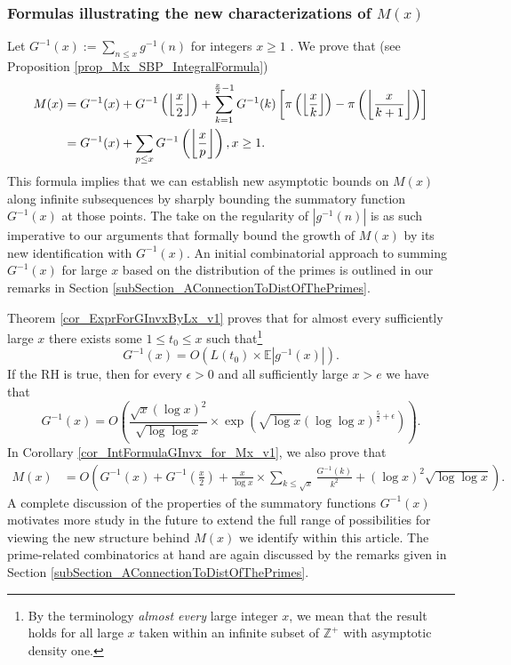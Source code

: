 \documentclass[11pt,reqno,a4letter]{article}
\numberwithin{figure}{section}
\numberwithin{table}{section}
\newcommand{\seqnum}[1]{\href{http://oeis.org/#1}{\color{ProcessBlue}{\underline{#1}}}}
\newcommand{\Floor}[2]{\ensuremath{\left\lfloor \frac{#1}{#2} \right\rfloor}}
\theoremstyle{plain}
\numberwithin{theorem}{section}
\theoremstyle{definition}
\begin{document}
\subsubsection{Formulas illustrating the new characterizations of $M(x)$} 

Let $G^{-1}(x) := \sum_{n \leq x} g^{-1}(n)$ for integers $x \geq 1$ 
\cite[\seqnum{A341472}]{OEIS}. 
We prove that (see Proposition \ref{prop_Mx_SBP_IntegralFormula}) 
\begin{align} 
\label{eqn_Mx_gInvnPixk_formula_v2} 
M(x) & = G^{-1}(x) + G^{-1}\left(\Floor{x}{2}\right) + 
     \sum_{k=1}^{\frac{x}{2}-1} G^{-1}(k) \left[ 
     \pi\left(\Floor{x}{k}\right) - \pi\left(\Floor{x}{k+1}\right) 
     \right] \\ 
\notag
     & = 
     G^{-1}(x) + \sum_{p \leq x} G^{-1}\left(\Floor{x}{p}\right), x \geq 1. 
\end{align} 
This formula 
implies that we can establish new asymptotic bounds on 
$M(x)$ along infinite subsequences
by sharply bounding the summatory function $G^{-1}(x)$ at those points. 
The take on the regularity of $|g^{-1}(n)|$ is as such imperative to our arguments 
that formally bound the growth 
of $M(x)$ by its new identification with $G^{-1}(x)$. 
An initial combinatorial approach to summing $G^{-1}(x)$ for large $x$ based on the distribution of the primes 
is outlined in our remarks in Section \ref{subSection_AConnectionToDistOfThePrimes}. 

Theorem \ref{cor_ExprForGInvxByLx_v1} proves that for almost every sufficiently large $x$ 
there exists some $1 \leq t_0 \leq x$ such that\footnote{
     By the terminology 
     \emph{almost every} large integer $x$, we mean that the result holds for all large $x$ 
     taken within an infinite subset of $\mathbb{Z}^{+}$ with asymptotic density one. 
} 
\[
G^{-1}(x) = O\left(L(t_0) \times \mathbb{E}|g^{-1}(x)|\right).
\]
If the RH is true, then 
for every $\epsilon > 0$ and all sufficiently large $x > e$ we have that  
\[
G^{-1}(x) = O\left(\frac{\sqrt{x} (\log x)^2}{\sqrt{\log\log x}} \times \exp\left(
     \sqrt{\log x} (\log\log x)^{\frac{5}{2}+\epsilon}\right) 
     \right). 
\]
In Corollary \ref{cor_IntFormulaGInvx_for_Mx_v1}, 
we also prove that 
\begin{align*}
M(x) & = O\left(G^{-1}(x) + G^{-1}\left(\frac{x}{2}\right) + 
     \frac{x}{\log x} \times \sum_{k \leq \sqrt{x}} \frac{G^{-1}(k)}{k^2} 
     + (\log x)^2 \sqrt{\log\log x}\right). 
\end{align*} 
A complete discussion of the properties of the summatory functions 
$G^{-1}(x)$ motivates more study in the future to 
extend the full range of possibilities for viewing 
the new structure behind $M(x)$ we identify within this article. 
The prime-related combinatorics at hand are again discussed by the remarks 
given in Section \ref{subSection_AConnectionToDistOfThePrimes}. 
\end{document}
